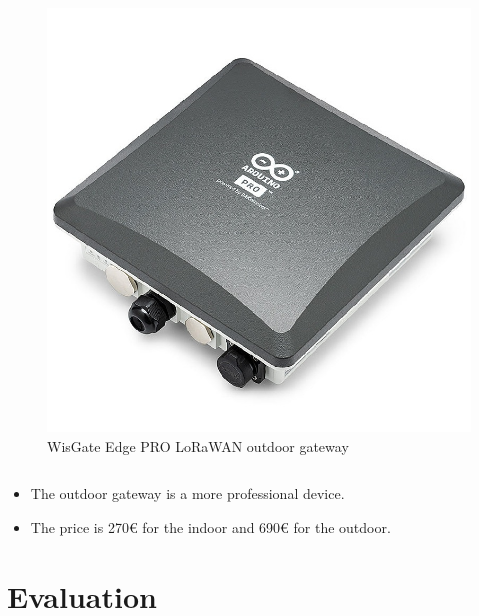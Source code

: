\documentclass{beamer}
\begin{document}
\begin{frame}
\begin{columns}[]
\begin{column}
\begin{figure}
                \includegraphics[width=\textwidth]{images/wisgate_outdoor.jpg}
                \caption{WisGate Edge PRO LoRaWAN outdoor gateway}
            \end{figure}
        \end{column}
    \end{columns}

    \vspace{0.5cm}

    \begin{itemize}[<+->]
        \item The outdoor gateway is a more professional device.
        \item The price is 270\euro{} for the indoor and 690\euro{} for the outdoor.
    \end{itemize}
\end{frame}

\section{Evaluation}
\end{document}
